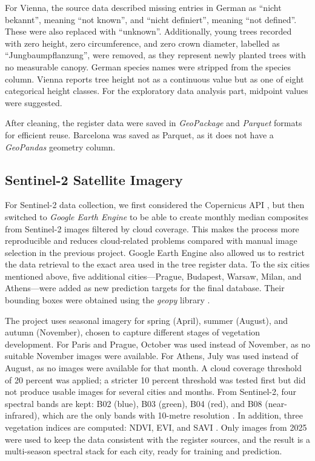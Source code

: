 For Vienna, the source data described missing entries in German as ``nicht bekannt'', meaning ``not known'', and ``nicht definiert'', meaning ``not defined''. These were also replaced with ``unknown''. Additionally, young trees recorded with zero height, zero circumference, and zero crown diameter, labelled as ``Jungbaumpflanzung'', were removed, as they represent newly planted trees with no measurable canopy. German species names were stripped from the species column. Vienna reports tree height not as a continuous value but as one of eight categorical height classes. For the exploratory data analysis part, midpoint values were suggested.

After cleaning, the register data were saved in \textit{GeoPackage} and \textit{Parquet} formats for efficient reuse. Barcelona was saved as Parquet, as it does not have a \textit{GeoPandas} geometry column.

\subsection{Sentinel-2 Satellite Imagery}

For Sentinel-2 data collection, we first considered the Copernicus API \cite{copernicus2025}, but then switched to \textit{Google Earth Engine} \cite{earthenginecodeeditor} to be able to create monthly median composites from Sentinel-2 images filtered by cloud coverage. This makes the process more reproducible and reduces cloud-related problems compared with manual image selection in the previous project. Google Earth Engine also allowed us to restrict the data retrieval to the exact area used in the tree register data. To the six cities mentioned above, five additional cities—Prague, Budapest, Warsaw, Milan, and Athens—were added as new prediction targets for the final database. Their bounding boxes were obtained using the \textit{geopy} library \cite{geopy}.

The project uses seasonal imagery for spring (April), summer (August), and autumn (November), chosen to capture different stages of vegetation development. For Paris and Prague, October was used instead of November, as no suitable November images were available. For Athens, July was used instead of August, as no images were available for that month. A cloud coverage threshold of 20 percent was applied; a stricter 10 percent threshold was tested first but did not produce usable images for several cities and months. From Sentinel-2, four spectral bands are kept: B02 (blue), B03 (green), B04 (red), and B08 (near-infrared), which are the only bands with 10-metre resolution \cite{sentinel2harmonized}. In addition, three vegetation indices are computed: NDVI, EVI, and SAVI \cite{ndvitutorial}. Only images from 2025 were used to keep the data consistent with the register sources, and the result is a multi-season spectral stack for each city, ready for training and prediction.

